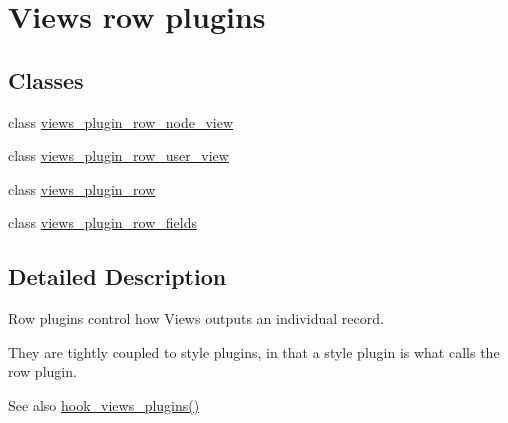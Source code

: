 \hypertarget{group__views__row__plugins}{
\section{Views row plugins}
\label{group__views__row__plugins}
}
\subsection*{Classes}
\begin{DoxyCompactItemize}
\item 
class \hyperlink{classviews__plugin__row__node__view}{views\_\-plugin\_\-row\_\-node\_\-view}
\item 
class \hyperlink{classviews__plugin__row__user__view}{views\_\-plugin\_\-row\_\-user\_\-view}
\item 
class \hyperlink{classviews__plugin__row}{views\_\-plugin\_\-row}
\item 
class \hyperlink{classviews__plugin__row__fields}{views\_\-plugin\_\-row\_\-fields}
\end{DoxyCompactItemize}


\subsection{Detailed Description}
Row plugins control how Views outputs an individual record.

They are tightly coupled to style plugins, in that a style plugin is what calls the row plugin.

\begin{DoxySeeAlso}{See also}
\hyperlink{group__views__hooks_ga23f6e9972b2ed84fc54b7ff63f44477d}{hook\_\-views\_\-plugins()} 
\end{DoxySeeAlso}
